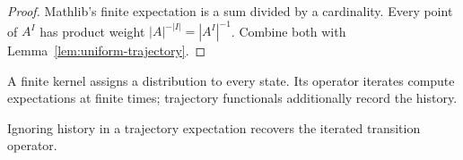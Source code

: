 \begin{proof}\leanok
Mathlib's finite expectation is a sum divided by a cardinality. Every point of $A^I$ has
product weight $|A|^{-|I|}=|A^I|^{-1}$. Combine both with Lemma~\ref{lem:uniform-trajectory}.
\end{proof}
\begin{definition}\label{def:kernel}
\leanok{}
A finite kernel assigns a distribution to every state. Its operator iterates
compute expectations at finite times; trajectory functionals additionally
record the history.
\end{definition}
\begin{lemma}\label{lem:endpoint}
\leanok{}
Ignoring history in a trajectory expectation recovers the iterated transition operator.
\end{lemma}

